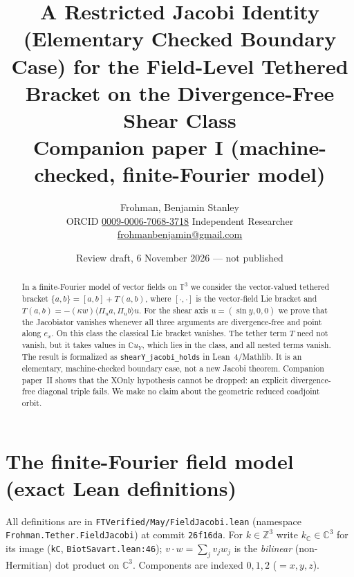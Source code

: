 \documentclass[11pt]{article}\emergencystretch=2em
\author{Frohman, Benjamin Stanley\\ \small ORCID \href{https://orcid.org/0009-0006-7068-3718}{0009-0006-7068-3718} \quad Independent Researcher \quad \href{mailto:frohmanbenjamin@gmail.com}{frohmanbenjamin@gmail.com}}
\date{Review draft, 6 November 2026 --- not published}
\title{A Restricted Jacobi Identity (Elementary Checked Boundary Case) for the Field-Level Tethered Bracket on the Divergence-Free Shear Class\\ \large Companion paper I (machine-checked, finite-Fourier model)}
\theoremstyle{definition}\newtheorem{definition}[theorem]{Definition}\theoremstyle{remark}\newtheorem{remark}[theorem]{Remark}
\begin{document}
\maketitle
\begin{abstract}
In a finite-Fourier model of vector fields on $\mathbb T^3$ we consider the vector-valued tethered bracket $\{a,b\}=[a,b]+T(a,b)$, where $[\cdot,\cdot]$ is the vector-field Lie bracket and $T(a,b)=-(\kappa w)\langle\Pi_u a,\Pi_u b\rangle u$. For the shear axis $u=(\sin y,0,0)$ we prove that the Jacobiator vanishes whenever all three arguments are divergence-free and point along $e_x$. On this class the classical Lie bracket vanishes. The tether term $T$ need not vanish, but it takes values in $\mathbb C u_Y$, which lies in the class, and all nested terms vanish. The result is formalized as \texttt{shearY\_jacobi\_holds} in Lean~4/Mathlib. It is an elementary, machine-checked boundary case, not a new Jacobi theorem. Companion paper~II shows that the XOnly hypothesis cannot be dropped: an explicit divergence-free diagonal triple fails. We make no claim about the geometric reduced coadjoint orbit.
\end{abstract}
\section{The finite-Fourier field model (exact Lean definitions)}
All definitions are in \texttt{FTVerified/May/FieldJacobi.lean} (namespace\\ \texttt{Frohman.Tether.FieldJacobi}) at commit \texttt{26f16da}. For $k\in\mathbb Z^3$ write $k_{\mathbb C}\in\mathbb C^3$ for its image (\texttt{kC}, \texttt{BiotSavart.lean:46}); $v\cdot w=\sum_{j}v_jw_j$ is the \emph{bilinear} (non-Hermitian) dot product on $\mathbb C^3$. Components are indexed $0,1,2$ ($=x,y,z$).
\end{document}

